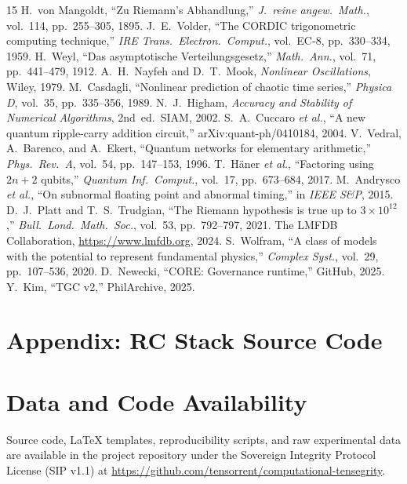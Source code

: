 \documentclass[10pt,twocolumn]{article}
\theoremstyle{definition}
\theoremstyle{remark}
\begin{document}
\begin{thebibliography}{15}
\small
{} H.~von Mangoldt, ``Zu Riemann's Abhandlung,'' \emph{J.~reine angew.\ Math.}, vol.~114, pp.~255--305, 1895.
 J.~E.~Volder, ``The CORDIC trigonometric computing technique,'' \emph{IRE Trans.\ Electron.\ Comput.}, vol.~EC-8, pp.~330--334, 1959.
 H.~Weyl, ``Das asymptotische Verteilungsgesetz,'' \emph{Math.\ Ann.}, vol.~71, pp.~441--479, 1912.
 A.~H.~Nayfeh and D.~T.~Mook, \emph{Nonlinear Oscillations}, Wiley, 1979.
 M.~Casdagli, ``Nonlinear prediction of chaotic time series,'' \emph{Physica D}, vol.~35, pp.~335--356, 1989.
 N.~J.~Higham, \emph{Accuracy and Stability of Numerical Algorithms}, 2nd~ed.\ SIAM, 2002.
 S.~A.~Cuccaro \emph{et al.}, ``A new quantum ripple-carry addition circuit,'' arXiv:quant-ph/0410184, 2004.
 V.~Vedral, A.~Barenco, and A.~Ekert, ``Quantum networks for elementary arithmetic,'' \emph{Phys.\ Rev.\ A}, vol.~54, pp.~147--153, 1996.
 T.~H\"aner \emph{et al.}, ``Factoring using $2n+2$ qubits,'' \emph{Quantum Inf.\ Comput.}, vol.~17, pp.~673--684, 2017.
 M.~Andrysco \emph{et al.}, ``On subnormal floating point and abnormal timing,'' in \emph{IEEE S\&P}, 2015.
 D.~J.~Platt and T.~S.~Trudgian, ``The Riemann hypothesis is true up to $3\times10^{12}$,'' \emph{Bull.\ Lond.\ Math.\ Soc.}, vol.~53, pp.~792--797, 2021.
 The LMFDB Collaboration, \url{https://www.lmfdb.org}, 2024.
 S.~Wolfram, ``A class of models with the potential to represent fundamental physics,'' \emph{Complex Syst.}, vol.~29, pp.~107--536, 2020.
 D.~Newecki, ``CORE: Governance runtime,'' GitHub, 2025.
 Y.~Kim, ``TGC v2,'' PhilArchive, 2025.
\end{thebibliography}

\onecolumn
\appendix
\section*{Appendix: RC Stack Source Code}



\section*{Data and Code Availability}
\label{sec:availability}
Source code, LaTeX templates, reproducibility scripts, and raw experimental data are available in the project repository under the Sovereign Integrity Protocol License (SIP v1.1) at \url{https://github.com/tensorrent/computational-tensegrity}.
\end{document}
